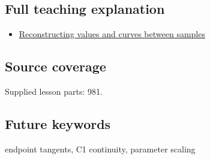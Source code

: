 \subsection{Full teaching explanation}\label{appendix-db3aef8f2fd6-full-teaching-explanation}

\begin{itemize}
\tightlist
\item
  \hyperref[02-foundations-ii-ch028-reconstructing-values-and-curves-between-samples]{Reconstructing values and curves between samples}
\end{itemize}

\subsection{Source coverage}\label{appendix-db3aef8f2fd6-source-coverage}

Supplied lesson parts: 981.

\subsection{Future keywords}\label{appendix-db3aef8f2fd6-future-keywords}

endpoint tangents, C1 continuity, parameter scaling
